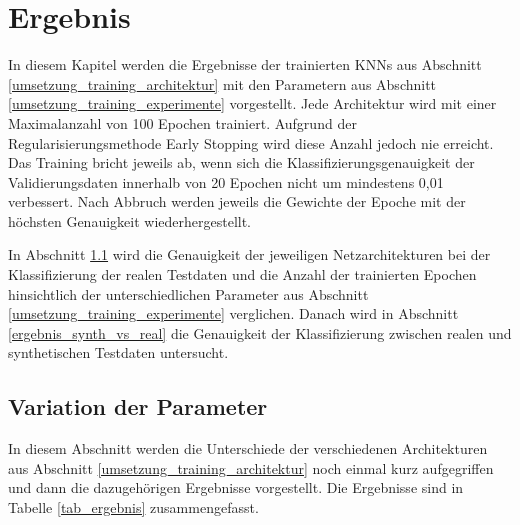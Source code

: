 

\chapter{Ergebnis}
\label{ergebnis}

In diesem Kapitel werden die Ergebnisse der trainierten \acp{KNN} aus Abschnitt \ref{umsetzung_training_architektur} mit den Parametern aus Abschnitt \ref{umsetzung_training_experimente} vorgestellt. Jede Architektur wird mit einer Maximalanzahl von 100 Epochen trainiert. Aufgrund der Regularisierungsmethode Early Stopping wird diese Anzahl jedoch nie erreicht. Das Training bricht jeweils ab, wenn sich die Klassifizierungsgenauigkeit der Validierungsdaten innerhalb von 20 Epochen nicht um mindestens 0,01 verbessert. Nach Abbruch werden jeweils die Gewichte der Epoche mit der höchsten Genauigkeit wiederhergestellt. 

In Abschnitt \ref{ergebnis_parameter} wird die Genauigkeit der jeweiligen Netzarchitekturen bei der Klassifizierung der realen Testdaten und die Anzahl der trainierten Epochen hinsichtlich der unterschiedlichen Parameter aus Abschnitt \ref{umsetzung_training_experimente} verglichen. Danach wird in Abschnitt \ref{ergebnis_synth_vs_real} die Genauigkeit der Klassifizierung zwischen realen und synthetischen Testdaten untersucht.


\section{Variation der Parameter}
\label{ergebnis_parameter}

In diesem Abschnitt werden die Unterschiede der verschiedenen Architekturen aus Abschnitt \ref{umsetzung_training_architektur} noch einmal kurz aufgegriffen und dann die dazugehörigen Ergebnisse vorgestellt. Die Ergebnisse sind in Tabelle \ref{tab_ergebnis} zusammengefasst.

